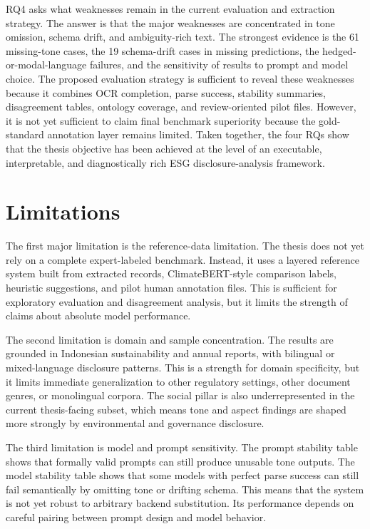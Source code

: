 RQ4 asks what weaknesses remain in the current evaluation and extraction strategy. The answer is that the major weaknesses are concentrated in tone omission, schema drift, and ambiguity-rich text. The strongest evidence is the 61 missing-tone cases, the 19 schema-drift cases in missing predictions, the hedged-or-modal-language failures, and the sensitivity of results to prompt and model choice. The proposed evaluation strategy is sufficient to reveal these weaknesses because it combines OCR completion, parse success, stability summaries, disagreement tables, ontology coverage, and review-oriented pilot files. However, it is not yet sufficient to claim final benchmark superiority because the gold-standard annotation layer remains limited. Taken together, the four RQs show that the thesis objective has been achieved at the level of an executable, interpretable, and diagnostically rich ESG disclosure-analysis framework.



\section{Limitations}

The first major limitation is the reference-data limitation. The thesis does not yet rely on a complete expert-labeled benchmark. Instead, it uses a layered reference system built from extracted records, ClimateBERT-style comparison labels, heuristic suggestions, and pilot human annotation files. This is sufficient for exploratory evaluation and disagreement analysis, but it limits the strength of claims about absolute model performance.

The second limitation is domain and sample concentration. The results are grounded in Indonesian sustainability and annual reports, with bilingual or mixed-language disclosure patterns. This is a strength for domain specificity, but it limits immediate generalization to other regulatory settings, other document genres, or monolingual corpora. The social pillar is also underrepresented in the current thesis-facing subset, which means tone and aspect findings are shaped more strongly by environmental and governance disclosure.

The third limitation is model and prompt sensitivity. The prompt stability table shows that formally valid prompts can still produce unusable tone outputs. The model stability table shows that some models with perfect parse success can still fail semantically by omitting tone or drifting schema. This means that the system is not yet robust to arbitrary backend substitution. Its performance depends on careful pairing between prompt design and model behavior.

